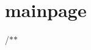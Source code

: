 \chapter{mainpage }
\hypertarget{md_doc_2mainpage}{}\label{md_doc_2mainpage}
/\+\texorpdfstring{$\ast$}{*}\texorpdfstring{$\ast$}{*} 